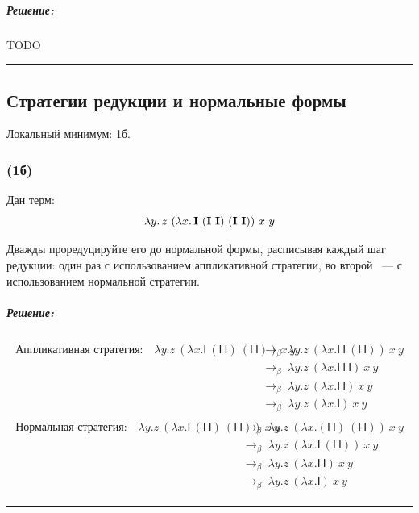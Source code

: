 \documentclass{article}
\newenvironment{proof}{\subparagraph{\hspace{-1em}Решение:\newline}}{\par\noindent\rule{\textwidth}{0.4pt}}
\newcommand{\comb}[1]{\mathbf{#1}}
\begin{document}
    \begin{proof}
        TODO %
    \end{proof}

    \subsection{Стратегии редукции и нормальные формы}

    Локальный минимум: 1б.

    \subsubsection{(1б)}

    Дан терм:
    \[\lambda y\ldotp z~(\lambda x\ldotp \comb{I}~(\comb{I}~\comb{I})~(\comb{I}~\comb{I}))~x~y\]

    Дважды проредуцируйте его до нормальной формы, расписывая каждый шаг редукции: один раз с использованием аппликативной стратегии, во второй ~--- с
    использованием нормальной стратегии.

    \begin{proof}
        \begin{gather*}
            \begin{aligned}
                \text{Аппликативная стратегия:} \quad
                \lambda y. z~(\lambda x. \mathsf{I}~(\mathsf{I}~\mathsf{I})~(\mathsf{I}~\mathsf{I}))~x~y
                &\;\to_\beta\; \lambda y. z~(\lambda x. \mathsf{I}~\mathsf{I}~(\mathsf{I}~\mathsf{I}))~x~y \\
                &\;\to_\beta\; \lambda y. z~(\lambda x. \mathsf{I}~\mathsf{I}~\mathsf{I})~x~y \\
                &\;\to_\beta\; \lambda y. z~(\lambda x. \mathsf{I}~\mathsf{I})~x~y \\
                &\;\to_\beta\; \lambda y. z~(\lambda x. \mathsf{I})~x~y
            \end{aligned}\\[1em]
            \begin{aligned}
                \text{Нормальная стратегия:} \quad
                \lambda y. z~(\lambda x. \mathsf{I}~(\mathsf{I}~\mathsf{I})~(\mathsf{I}~\mathsf{I}))~x~y
                &\;\to_\beta\; \lambda y. z~(\lambda x. (\mathsf{I}~\mathsf{I})~(\mathsf{I}~\mathsf{I}))~x~y \\
                &\;\to_\beta\; \lambda y. z~(\lambda x. \mathsf{I}~(\mathsf{I}~\mathsf{I}))~x~y \\
                &\;\to_\beta\; \lambda y. z~(\lambda x. \mathsf{I}~\mathsf{I})~x~y \\
                &\;\to_\beta\; \lambda y. z~(\lambda x. \mathsf{I})~x~y
            \end{aligned}
        \end{gather*}
    \end{proof}
\end{document}
